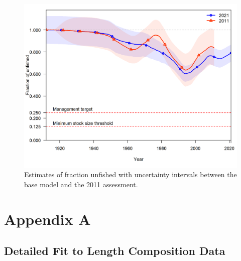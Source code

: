 \documentclass[11pt,
  english,
  a4paper,
]{article}
\begin{document}
\tagmcend\tagstructend


\begin{figure}
\centering
\includegraphics[width=1\textwidth,height=1\textheight]{figs/2021_2011_compare4_Bratio_uncertainty.png}
\caption{Estimates of fraction unfished with uncertainty intervals between the base model and the 2011 assessment.\label{fig:depl-2011-2021}}
\end{figure}

\tagmcend\tagstructend

\clearpage


\hypertarget{appendix-a}{%
\section{Appendix A}\label{appendix-a}}

\leavevmode\tagmcend\tagstructend


\hypertarget{len-fit-data}{%
\subsection{Detailed Fit to Length Composition Data}\label{len-fit-data}}

\leavevmode\tagmcend\tagstructend
\end{document}
